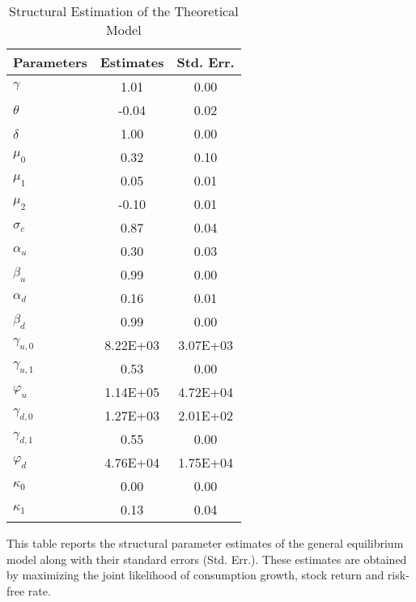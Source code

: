 \documentclass[11pt]{article}
\begin{document}

\newpage
\clearpage

\begin{table}
\caption{Structural Estimation of the Theoretical Model}\label{TabGEEstimation}
\begin{center}\scriptsize
\begin{tabular*}{0.95\textwidth}{@{\extracolsep{\fill}}lcc}
\hline%
{Parameters}&{Estimates}&{Std. Err.}\\\hline
$\gamma$&1.01&0.00\\
$\theta$&-0.04&0.02\\
$\delta$&1.00&0.00\\
$\mu_0$&0.32&0.10\\
$\mu_1$&0.05&0.01\\
$\mu_2$&-0.10&0.01\\
$\sigma_c$&0.87&0.04\\
$\alpha_u$&0.30&0.03\\
$\beta_u$&0.99&0.00\\
$\alpha_d$&0.16&0.01\\
$\beta_d$&0.99&0.00\\
$\gamma_{u,0}$&8.22E+03&3.07E+03\\
$\gamma_{u,1}$&0.53&0.00\\
$\varphi_{u}$&1.14E+05&4.72E+04\\
$\gamma_{d,0}$&1.27E+03&2.01E+02\\
$\gamma_{d,1}$&0.55&0.00\\
$\varphi_{d}$&4.76E+04&1.75E+04\\
$\kappa_0$&0.00&0.00\\
$\kappa_1$&0.13&0.04\\
\hline%
\end{tabular*}
\end{center}
\noindent \scriptsize This table reports the structural parameter estimates of the general equilibrium model along with their standard errors (Std. Err.). These estimates are obtained by maximizing the joint likelihood of consumption growth, stock return and risk-free rate.
\end{table}
\end{document}

